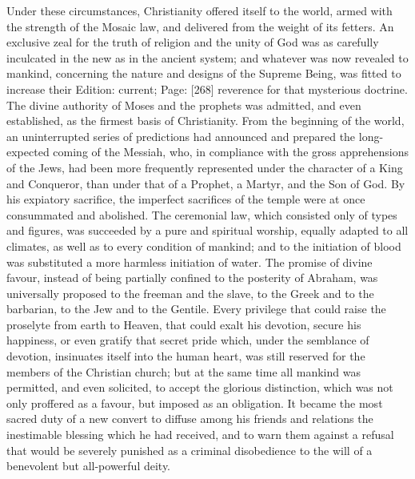 Under these circumstances, Christianity offered itself to the world, armed with the strength of the Mosaic law, and delivered from the weight of its fetters. An exclusive zeal for the truth of religion and the unity of God was as carefully inculcated in the new as in the ancient system; and whatever was now revealed to mankind, concerning the nature and designs of the Supreme Being, was fitted to increase their Edition: current; Page: [268] reverence for that mysterious doctrine. The divine authority of Moses and the prophets was admitted, and even established, as the firmest basis of Christianity. From the beginning of the world, an uninterrupted series of predictions had announced and prepared the long-expected coming of the Messiah, who, in compliance with the gross apprehensions of the Jews, had been more frequently represented under the character of a King and Conqueror, than under that of a Prophet, a Martyr, and the Son of God. By his expiatory sacrifice, the imperfect sacrifices of the temple were at once consummated and abolished. The ceremonial law, which consisted only of types and figures, was succeeded by a pure and spiritual worship, equally adapted to all climates, as well as to every condition of mankind; and to the initiation of blood was substituted a more harmless initiation of water. The promise of divine favour, instead of being partially confined to the posterity of Abraham, was universally proposed to the freeman and the slave, to the Greek and to the barbarian, to the Jew and to the Gentile. Every privilege that could raise the proselyte from earth to Heaven, that could exalt his devotion, secure his happiness, or even gratify that secret pride which, under the semblance of devotion, insinuates itself into the human heart, was still reserved for the members of the Christian church; but at the same time all mankind was permitted, and even solicited, to accept the glorious distinction, which was not only proffered as a favour, but imposed as an obligation. It became the most sacred duty of a new convert to diffuse among his friends and relations the inestimable blessing which he had received, and to warn them against a refusal that would be severely punished as a criminal disobedience to the will of a benevolent but all-powerful deity.

